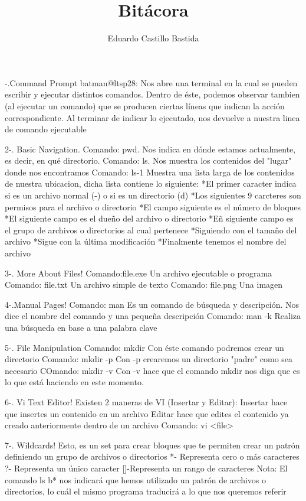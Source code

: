\documentclass{article}
\title{Bitácora}
\author{Eduardo Castillo Bastida}
\begin{document}
-.Command Prompt
	batman@ltsp28:
		Nos abre una terminal en la cual se pueden escribir y ejecutar
		distintos comandos.
		Dentro de éste, podemos observar tambien (al ejecutar un comando) que
		se producen ciertas líneas que indican la acción correspondiente.
		Al terminar de indicar lo ejecutado, nos devuelve a nuestra linea de
		comando ejecutable
        
2-. Basic Navigation.
	Comando: pwd.
		Nos indica en dónde estamos actualmente, es decir, en qué directorio.
	Comando: ls.
		Nos muestra los contenidos del "lugar" donde nos encontramos
	Comando: ls-1
		Muestra una lista larga de los contenidos de nuestra ubicacion, dicha
		lista contiene lo siguiente:
		*El primer caracter indica si es un archivo normal (-) o si es un
		directorio (d)
		*Los siguientes 9 carcteres son permisos para el archivo o directorio
		*El campo siguiente es el número de bloques
		*El siguiente campo es el dueño del archivo o directorio
		*Eñ siguiente campo es el grupo de archivos o directorios al cual
		pertenece
		*Siguiendo con el tamaño del archivo
		*Sigue con la última modificación
		*Finalmente tenemos el nombre del archivo
       
3-. More About Files!
	Comando:file.exe
		Un archivo ejecutable o programa
	Comando: file.txt
		Un archivo simple de texto
	Comando: file.png
		Una imagen

4-.Manual Pages!
	Comando: man
		Es un comando de búsqueda y descripción.
		Nos dice el nombre del comando y una pequeña descripción
	Comando: man -k
		Realiza una búsqueda en base a una palabra clave

5-. File Manipulation
	Comando: mkdir
		Con éste comando podremos crear un directorio
	Comando: mkdir -p
		Con -p crearemos un directorio "padre" como sea necesario
	COmando: mkdir -v
		Con -v hace que el comando mkdir nos diga que es lo que está haciendo en este 			momento.

6-. Vi Text Editor!
	Existen 2 maneras de VI (Insertar y Editar):
		Insertar hace que insertes un contenido en un archivo
		Editar hace que edites el contenido ya creado anteriormente dentro de un archivo
			Comando: vi <file>

7-. Wildcards!
	Esto, es un set para crear bloques que te permiten crear un patrón definiendo un grupo de 	archivos o directorios
		*- Representa cero o más caracteres
		?- Representa un único caracter
		[]-Representa un rango de caracteres
Nota: El comando ls b* nos indicará que hemos utilizado un patrón de archivos o directorios, lo cuál el mismo programa traducirá a lo que nos queremos referir
\end{document}
